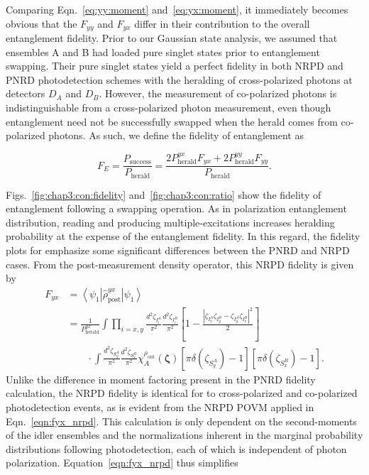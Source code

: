 \documentclass[aps,twocolumn,secnumarabic,amsmath,amssymb,pra,groupedaddress,
showpacs, showkeys]{revtex4-1}
\newcommand{\bra}[1]{\left\langle #1 \right|}
\newcommand{\ket}[1]{\left|#1\right\rangle}
\newcommand{\pna}[1]{\left(#1\right)}
\newcommand{\pnb}[1]{\left[#1\right]}
\newcommand{\eqn}[1]{
\begin{equation}
	#1
\end{equation}
}
\begin{document}
Comparing Eqn.~\ref{eq:yy:moment} and~\ref{eq:yx:moment}, it immediately
becomes obvious that the $F_{yy}$ and $F_{yx}$ differ in their contribution to
the overall entanglement fidelity. Prior to our Gaussian state analysis, we
assumed that ensembles A and B had loaded pure singlet states prior to
entanglement swapping. Their pure singlet states yield a perfect fidelity in
both NRPD and PNRD photodetection schemes with the heralding of cross-polarized
photons at detectors $D_A$ and $D_B$. However, the measurement of co-polarized
photons is indistinguishable from a cross-polarized photon measurement, even
though entanglement need not be successfully swapped when the herald comes from
co-polarized photons. As such, we define the fidelity of entanglement as
\eqn{
F_E = \frac{P_{\textrm{success}}}{P_{\textrm{herald}}}=  \frac{2P_{\textrm{herald}}^{yx}F_{yx}+2P_{\textrm{herald}}^{yy}F_{yy}}{P_{\textrm{herald}}}.
}
Figs.~\ref{fig:chap3:con:fidelity} and~\ref{fig:chap3:con:ratio} show the
fidelity of entanglement following a swapping operation. As in polarization
entanglement distribution, reading and producing multiple-excitations increases
heralding probability at the expense of the entanglement fidelity. In this
regard, the fidelity plots for emphasize some significant differences between
the PNRD and NRPD cases. From the post-measurement density operator, this NRPD
fidelity is given by
\begin{align}
F_{yx} & = \bra{\psi_{1}} \hat{\rho}_{\textrm{post}}^{yx} \ket{\psi_1} \nonumber \\
& =\frac{1}{P_{\textrm{herald}}^{yx}}\int 
\prod_{i=x,y}
\frac{d^2 \zeta_{I_i^A}}{\pi^2} 
\frac{d^2 \zeta_{I_i^B}}{\pi^2} 
\pnb{1-\frac{|\zeta_{I_x^A}\zeta_{I_y^B}-\zeta_{I_y^A}\zeta_{I_x^B}|^2}{2}}  \nonumber \\
& \qquad \cdot \int 
\frac{d^2 \zeta_{S_y^A}}{\pi^2} 
\frac{d^2 \zeta_{S_x^B}}{\pi^2}
\chi_A^{\rho_{\textrm{out}}}\pna{\bm{\zeta}} 
\pnb{\pi\delta\pna{\zeta_{S_y^A}}-1}\pnb{\pi\delta\pna{\zeta_{S_x^B}}-1}.\label{eqn:fyx_nrpd}
\end{align}
Unlike the difference in moment factoring present in the PNRD fidelity
calculation, the NRPD fidelity is identical for to cross-polarized and
co-polarized photodetection events, as is evident from the NRPD POVM applied in
Eqn.~\ref{eqn:fyx_nrpd}. This calculation is only dependent on the
second-moments of the idler ensembles and the normalizations inherent in the
marginal probability distributions following photodetection, each of which is
independent of photon polarization. Equation~\ref{eqn:fyx_nrpd} thus simplifies
\end{document}
